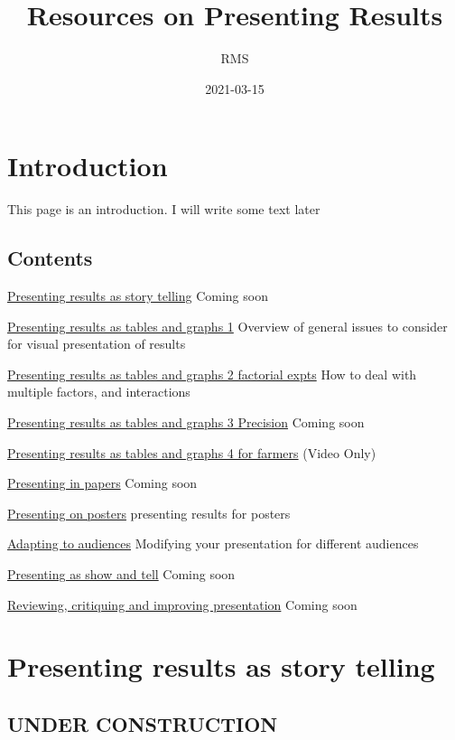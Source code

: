 \documentclass[
]{book}
\title{Resources on Presenting Results}
\author{RMS}
\date{2021-03-15}
\begin{document}
\maketitle

{
\setcounter{tocdepth}{1}
\tableofcontents
}
\hypertarget{introduction}{%
\chapter{Introduction}\label{introduction}}

This page is an introduction. I will write some text later

\hypertarget{contents}{%
\section{Contents}\label{contents}}

\protect\hyperlink{story}{Presenting results as story telling}
Coming soon

\protect\hyperlink{tablegraph1}{Presenting results as tables and graphs 1}
Overview of general issues to consider for visual presentation of results

\protect\hyperlink{factor}{Presenting results as tables and graphs 2 factorial expts}
How to deal with multiple factors, and interactions

\protect\hyperlink{precision}{Presenting results as tables and graphs 3 Precision}
Coming soon

\protect\hyperlink{farmers}{Presenting results as tables and graphs 4 for farmers}
(Video Only)

\protect\hyperlink{papers}{Presenting in papers}
Coming soon

\protect\hyperlink{posters}{Presenting on posters}
presenting results for posters

\protect\hyperlink{audience}{Adapting to audiences}
Modifying your presentation for different audiences

\protect\hyperlink{showandtell}{Presenting as show and tell}
Coming soon

\protect\hyperlink{review}{Reviewing, critiquing and improving presentation}
Coming soon

\hypertarget{story}{%
\chapter{Presenting results as story telling}\label{story}}

\hypertarget{under-construction}{%
\section{UNDER CONSTRUCTION}\label{under-construction}}
\end{document}

